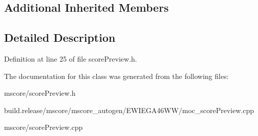 \subsection*{Additional Inherited Members}


\subsection{Detailed Description}


Definition at line 25 of file score\+Preview.\+h.



The documentation for this class was generated from the following files\+:\begin{DoxyCompactItemize}
\item 
mscore/score\+Preview.\+h\item 
build.\+release/mscore/mscore\+\_\+autogen/\+E\+W\+I\+E\+G\+A46\+W\+W/moc\+\_\+score\+Preview.\+cpp\item 
mscore/score\+Preview.\+cpp\end{DoxyCompactItemize}
